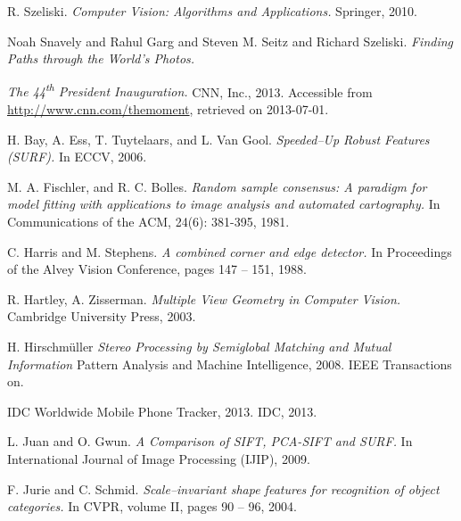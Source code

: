 
\def\bibname{Bibliography}
\begin{thebibliography}{99}
\addcontentsline{toc}{chapter}{\bibname}

  {\sc R. Szeliski.}
  \emph{Computer Vision: Algorithms and Applications.}
  Springer, 2010. 

  {\sc Noah Snavely and Rahul Garg and Steven M. Seitz and Richard Szeliski.} 
  \emph{Finding Paths through the World's Photos.}

  \emph{The 44\textsuperscript{th} President Inauguration.}
  CNN, Inc., 2013. Accessible from \url{http://www.cnn.com/themoment}, retrieved on 2013-07-01.

  {\sc  H. Bay, A. Ess, T. Tuytelaars, and L. Van Gool.}
  \emph{Speeded–Up Robust Features (SURF).}
  In ECCV, 2006.

  {\sc M. A. Fischler, and R. C. Bolles.} 
  \emph{Random sample consensus: A paradigm for model fitting with applications to image analysis and automated cartography.} 
  In Communications of the ACM, 24(6): 381-395, 1981.

  {\sc C. Harris and M. Stephens.} 
  \emph{A combined corner and edge detector.}
  In Proceedings of the Alvey Vision Conference, pages 147 – 151, 1988.

  {\sc  R. Hartley, A. Zisserman.}
  \emph{Multiple View Geometry in Computer Vision.}
  Cambridge University Press, 2003.

  {\sc  H. Hirschmüller}
  \emph{Stereo Processing by Semiglobal Matching and Mutual Information}
  Pattern Analysis and Machine Intelligence, 2008. IEEE Transactions on.

  IDC Worldwide Mobile Phone Tracker, 2013. IDC, 2013.

  {\sc L. Juan and O. Gwun.} 
  \emph{A Comparison of SIFT, PCA-SIFT and SURF.}
  In International Journal of Image Processing (IJIP), 2009.

  {\sc F. Jurie and C. Schmid.} 
  \emph{Scale–invariant shape features for recognition of object categories.}
  In CVPR, volume II, pages 90 – 96, 2004.


\end{thebibliography}
